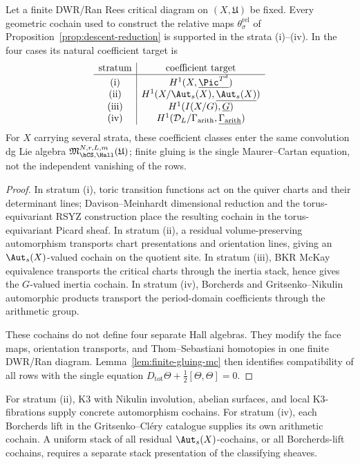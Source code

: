 \begin{proposition}
\label{thm:four-stratum-structural}
Let a finite DWR/Ran Rees critical diagram on $(X,\mathfrak U)$ be
fixed. Every geometric cochain used to construct the relative maps
$\theta_\sigma^{\mathrm{rel}}$ of
Proposition~\ref{prop:descent-reduction} is supported in the strata
(i)--(iv). In the four cases its natural coefficient target is
\[
\begin{array}{c|c}
\textup{stratum} & \textup{coefficient target}\\ \hline
\textup{(i)} &
H^1(X,\underline{\Pic^{T^d}})\\
\textup{(ii)} &
H^1(X/\Aut_s(X),\underline{\Aut_s(X)})\\
\textup{(iii)} &
H^1(I(X/G),\underline G)\\
\textup{(iv)} &
H^1(\mathcal D_L/\Gamma_{\mathrm{arith}},
\underline{\Gamma_{\mathrm{arith}}})
\end{array}
\]
For $X$ carrying several strata, these coefficient classes enter the
same convolution dg Lie algebra
$\mathfrak M_{\hCS,\Hall}^{N,r,L,m}(\mathfrak U)$; finite gluing is the
single Maurer--Cartan equation, not the independent vanishing of the
rows.
\end{proposition}

\begin{proof}
In stratum (i), toric transition functions act on the quiver charts
and their determinant lines; Davison--Meinhardt dimensional reduction
and the torus-equivariant RSYZ construction place the resulting
cochain in the torus-equivariant Picard sheaf. In stratum (ii), a
residual volume-preserving automorphism transports chart
presentations and orientation lines, giving an
$\Aut_s(X)$-valued cochain on the quotient site. In stratum (iii), BKR
McKay equivalence transports the critical charts through the inertia
stack, hence gives the $G$-valued inertia cochain. In stratum (iv),
Borcherds and Gritsenko--Nikulin automorphic products transport the
period-domain coefficients through the arithmetic group.

These cochains do not define four separate Hall algebras. They modify
the face maps, orientation transports, and Thom--Sebastiani homotopies
in one finite DWR/Ran diagram. Lemma~\ref{lem:finite-gluing-mc} then
identifies compatibility of all rows with the single equation
$D_{\mathrm{tot}}\Theta+\frac12[\Theta,\Theta]=0$.
\end{proof}

\begin{remark}
\label{rem:bii-biv-scope}
For stratum (ii), K3 with Nikulin involution, abelian surfaces, and
local K3-fibrations supply concrete automorphism cochains. For stratum
(iv), each Borcherds lift in the Gritsenko--Cl\'ery catalogue supplies
its own arithmetic cochain. A uniform stack of all residual
$\Aut_s(X)$-cochains, or all Borcherds-lift cochains, requires a
separate stack presentation of the classifying sheaves.
\end{remark}

